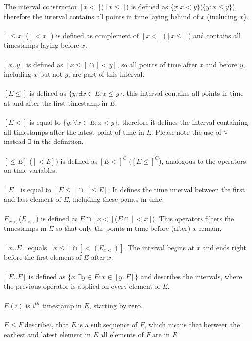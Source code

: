 	The interval constructor $[x<]$($[x\leq]$) is defined as $\{y: x < y\}$($\{y: x \leq y\}$), therefore the interval contains all points in time laying behind of $x$ (including $x$).\\ \\
	$[\leq x]$($[< x]$) is defined as complement of $[x<]$($[x\leq]$) and contains all timestamps laying before $x$.\\ \\
	$[x..y]$ is defined as $[x\leq]\cap[<y]$, so all points of time after $x$ and before $y$, including $x$ but not $y$, are part of this interval.\\ \\
	$[E \leq]$ is defined as $\{y : \exists x \in E : x \leq y\}$, this interval contains all points in time at and after the first timestamp in $E$.\\ \\
	$[E<]$ is equal to $\{y : \forall x \in E : x < y\}$, therefore it defines the interval containing all timestamps after the latest point of time in $E$. Please note the use of $\forall$ instead $\exists$ in the definition.\\ \\
	$[\leq E]$ ($[< E]$) is defined as $[E<]^C$ ($[E\leq]^C$), analogous to the operators on time variables.\\ \\
	$[E]$ is equal to $[E\leq]\cap[\leq E]$. It defines the time interval between the first and last element of $E$, including these points in time.\\ \\
	$E_{x<}$($E_{<x}$) is defined as $E\cap [x<]$($E\cap [<x]$). This operators filters the timestamps in $E$ so that only the points in time before (after) $x$ remain.\\ \\
	$[x..E]$ equals $[x\leq]\cap[<(E_{x<})]$. The interval begins at $x$ and ends right before the first element of $E$ after $x$.\\ \\
	$[E..F]$ is defined as $\{x:\exists y\in E:x\in[y..F]\}$ and describes the intervals, where the previous operator is applied on every element of $E$.\\ \\
	$E(i)$ is $i^{th}$ timestamp in $E$, starting by zero.\\ \\
	$E\leq F$ describes, that $E$ is a sub sequence of $F$, which means that between the earliest and latest element in $E$ all elements of $F$ are in $E$.
	

